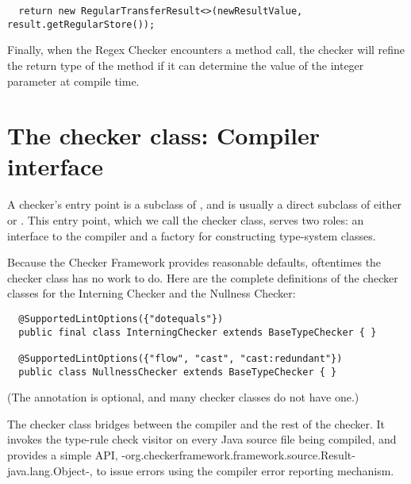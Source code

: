 \begin{enumerate}
\begin{smaller}
\begin{Verbatim}
  return new RegularTransferResult<>(newResultValue, result.getRegularStore());
\end{Verbatim}
\end{smaller}

Finally, when the Regex Checker encounters a  method
call, the checker will refine the return type of the method if it can determine
the value of the integer parameter at compile time.

\end{enumerate}


\section{The checker class:  Compiler interface\label{writing-compiler-interface}}

A checker's entry point is a subclass of
, and is usually a direct subclass
of either  or
.
This entry
point, which we call the checker class, serves two
roles:  an interface to the compiler and a factory for constructing
type-system classes.

Because the Checker Framework provides reasonable defaults, oftentimes the
checker class has no work to do.  Here are the complete definitions of the
checker classes for the Interning Checker and the Nullness Checker:

\begin{Verbatim}
  @SupportedLintOptions({"dotequals"})
  public final class InterningChecker extends BaseTypeChecker { }

  @SupportedLintOptions({"flow", "cast", "cast:redundant"})
  public class NullnessChecker extends BaseTypeChecker { }
\end{Verbatim}

(The  annotation is
optional, and many checker classes do not have one.)

The checker class bridges between the compiler and the rest of the checker.  It
invokes the type-rule check visitor on every Java source file being
compiled, and provides a simple API,
{-org.checkerframework.framework.source.Result-java.lang.Object-}, to issue
errors using the compiler error reporting mechanism.


